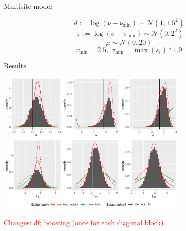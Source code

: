 \documentclass[
  ignorenonframetext,
]{beamer}
\begin{document}
\begin{frame}{Multisite model}
\protect\hypertarget{multisite-model}{}

\[d := \log(\nu-\nu_{\min})\sim \mathcal{N}(1,1.5^2)\]
\[\varsigma := \log(\sigma-\sigma_{\min})\sim \mathcal{N}(0,2^2)\]
\[\mu\sim\mathcal{N}(0,20)\nonumber\]
\[\nu_{\min}=2.5,\;\sigma_{\min}=\max(s_i)*1.9\]

\end{frame}

\begin{frame}{Results}
\protect\hypertarget{results}{}

\includegraphics[width=3.65in]{ECHSfits.pdf}

\textcolor{red}{{\scriptsize Changes: df; boosting (once for each diagonal block)}}

\end{frame}
\end{document}
